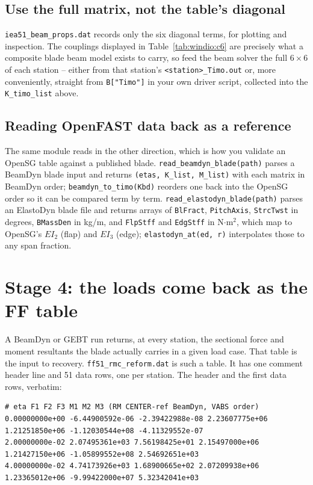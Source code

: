\subsection*{Use the full matrix, not the table's diagonal}

\texttt{iea51\_beam\_props.dat} records only the six diagonal terms, for
plotting and inspection. The couplings displayed in Table~\ref{tab:windio:c6}
are precisely what a composite blade beam model exists to carry, so feed the
beam solver the full $6\times6$ of each station -- either from that station's
\texttt{<station>\_Timo.out} or, more conveniently, straight from
\texttt{B["Timo"]} in your own driver script, collected into the
\texttt{K\_timo\_list} above.

\subsection*{Reading OpenFAST data back as a reference}

The same module reads in the other direction, which is how you validate an
OpenSG table against a published blade. \texttt{read\_beamdyn\_blade(path)}
parses a BeamDyn blade input and returns \texttt{(etas, K\_list, M\_list)} with
each matrix in BeamDyn order; \texttt{beamdyn\_to\_timo(Kbd)} reorders one back
into the OpenSG order so it can be compared term by term.
\texttt{read\_elastodyn\_blade(path)} parses an ElastoDyn blade file and returns
arrays of \texttt{BlFract}, \texttt{PitchAxis}, \texttt{StrcTwst} in degrees,
\texttt{BMassDen} in kg/m, and \texttt{FlpStff} and \texttt{EdgStff} in
N$\cdot$m$^2$, which map to OpenSG's $EI_2$ (flap) and $EI_3$ (edge);
\texttt{elastodyn\_at(ed, r)} interpolates those to any span fraction.

\section{Stage 4: the loads come back as the FF table}
\label{sec:windio:stage4}

A BeamDyn or GEBT run returns, at every station, the sectional force and moment
resultants the blade actually carries in a given load case. That table is the
input to recovery. \texttt{ff51\_rmc\_reform.dat} is such a table. It has one
comment header line and 51 data rows, one per station. The header and the first
data rows, verbatim:

\begin{lstlisting}[style=shellst,basicstyle=\ttfamily\tiny]
# eta F1 F2 F3 M1 M2 M3 (RM CENTER-ref BeamDyn, VABS order)
0.00000000e+00 -6.44900592e-06 -2.39422988e-08 2.23607775e+06 1.21251850e+06 -1.12030544e+08 -4.11329552e-07
2.00000000e-02 2.07495361e+03 7.56198425e+01 2.15497000e+06 1.21427150e+06 -1.05899552e+08 2.54692651e+03
4.00000000e-02 4.74173926e+03 1.68900665e+02 2.07209938e+06 1.23365012e+06 -9.99422000e+07 5.32342041e+03
\end{lstlisting}

